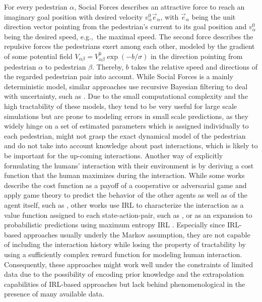 For every pedestrian $\alpha$, Social Forces describes an attractive force to reach an imaginary goal position with desired velocity $v^0_{\alpha} \vec{e}_{\alpha}$, with $\vec{e}_{\alpha}$ being the unit direction vector pointing from the pedestrian's current to its goal position and $v^0_{\alpha}$ being the desired speed, e.g.,\ the maximal speed. The second force describes the repulsive forces the pedestrians exert among each other, modeled by the gradient of some potential field $V_{\alpha \beta} = V_{\alpha \beta}^0 \exp(-b / \sigma)$ in the direction pointing from pedestrian $\alpha$ to pedestrian $\beta$. Thereby, $b$ takes the relative speed and directions of the regarded pedestrian pair into account. While Social Forces is a mainly deterministic model, similar approaches use recursive Bayesian filtering to deal with uncertainty, such as \cite{Schneider2013}\cite{Rehder2015}\cite{Guo2016}. Due to the small computational complexity and the high tractability of these models, they tend to be very useful for large scale simulations but are prone to modeling errors in small scale predictions, as they widely hinge on a set of estimated parameters which is assigned individually to each pedestrian, might not grasp the exact dynamical model of the pedestrian and do not take into account knowledge about past interactions, which is likely to be important for the up-coming interactions.
\newline
Another way of explicitly formulating the humans' interaction with their environment is by deriving a cost function that the human maximizes during the interaction. While some works describe the cost function as a payoff of a cooperative or adversarial game and apply game theory to predict the behavior of the other agents as well as of the agent itself, such as \cite{Bouzat2014}\cite{Nikolaidis2017}, other works use \ac{IRL} \cite{Ng2000} to characterize the interaction as a value function assigned to each state-action-pair, such as \cite{Fahad2018}\cite{Fernando2019}\cite{Saleh2018}, or as an expansion to probabilistic predictions using maximum entropy \ac{IRL} \cite{Ziebart2008}. Especially since \ac{IRL}-based approaches usually underly the Markov assumption, they are not capable of including the interaction history while losing the property of tractability by using a sufficiently complex reward function for modeling human interaction. Consequently, these approaches might work well under the constraints of limited data due to the possibility of encoding prior knowledge and the extrapolation capabilities of \ac{IRL}-based approaches but lack behind phenomenological in the presence of many available data.

